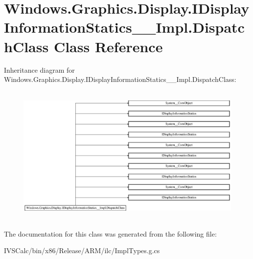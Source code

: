 \hypertarget{class_windows_1_1_graphics_1_1_display_1_1_i_display_information_statics_____impl_1_1_dispatch_class}{}\section{Windows.\+Graphics.\+Display.\+I\+Display\+Information\+Statics\+\_\+\+\_\+\+Impl.\+Dispatch\+Class Class Reference}
\label{class_windows_1_1_graphics_1_1_display_1_1_i_display_information_statics_____impl_1_1_dispatch_class}
Inheritance diagram for Windows.\+Graphics.\+Display.\+I\+Display\+Information\+Statics\+\_\+\+\_\+\+Impl.\+Dispatch\+Class\+:\begin{figure}[H]
\begin{center}
\leavevmode
\includegraphics[height=7.015945cm]{class_windows_1_1_graphics_1_1_display_1_1_i_display_information_statics_____impl_1_1_dispatch_class}
\end{center}
\end{figure}


The documentation for this class was generated from the following file\+:\begin{DoxyCompactItemize}
\item 
I\+V\+S\+Calc/bin/x86/\+Release/\+A\+R\+M/ilc/Impl\+Types.\+g.\+cs\end{DoxyCompactItemize}
